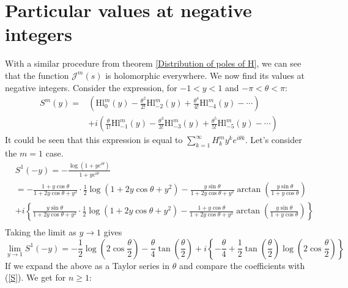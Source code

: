 \documentclass{article}
\begin{document}
\section{Particular values at negative integers} With a similar procedure from theorem \ref{Distribution of poles of H}, we can see that the function $\mathcal{J}^m(s)$ is holomorphic everywhere. We now find its values at negative integers.
Consider the expression, for $-1<y<1$ and $-\pi< \theta<\pi$:
\begin{equation}\label{S}\begin{split}
    S^m(y)=& \left(\mathrm{Hl}_{0}^m(y)-\frac{\theta^2}{2!}\mathrm{Hl}_{-2}^m(y)+\frac{\theta^4}{4!}\mathrm{Hl}_{-4}^m(y)-\cdots\right)\\ & +i\left(\frac{\theta}{1!}\mathrm{Hl}_{-1}^m(y)-\frac{\theta^3}{3!}\mathrm{Hl}_{-3}^m(y)+\frac{\theta^5}{5!}\mathrm{Hl}_{-5}^m(y)-\cdots\right)\end{split}
\end{equation}
It could be seen that this expression is equal to $\sum_{k=1}^{\infty}H_k^m y^k e^{i\theta k}$. Let's consider the $m=1$ case.
\begin{align*}
    &S^1(-y) = -\frac{\log(1+ye^{i\theta})}{1+ye^{i\theta}}\\
    &=  -\frac{1+y \cos \theta}{1+2y\cos \theta+y^2}\cdot \frac{1}{2}\log(1+2y\cos \theta+y^2)-\frac{y\sin \theta}{1+2y\cos\theta +y^2} \arctan \left(\frac{y\sin \theta}{1+y\cos \theta}\right) \\ & +i\left\{\frac{y\sin \theta}{1+2y\cos\theta +y^2}\cdot \frac{1}{2}\log(1+2y\cos \theta+y^2)- \frac{1+y \cos \theta}{1+2y\cos \theta+y^2} \arctan \left(\frac{y\sin \theta}{1+y\cos \theta}\right)\right\} \\ 
\end{align*}
Taking the limit as $y\to 1$ gives
$$\lim_{y\to 1}S^1(-y)= -\frac{1}{2}\log\left(2\cos\frac{\theta}{2}\right)-\frac{\theta}{4}\tan\left(\frac{\theta}{2}\right)+i\left\{-\frac{\theta}{4}+\frac{1}{2}\tan\left(\frac{\theta}{2}\right)\log\left(2\cos\frac{\theta}{2}\right)\right\}$$
If we expand the above as a Taylor series in $\theta$ and compare the coefficients with (\ref{S}). We get for $n\geq 1$:
\end{document}
